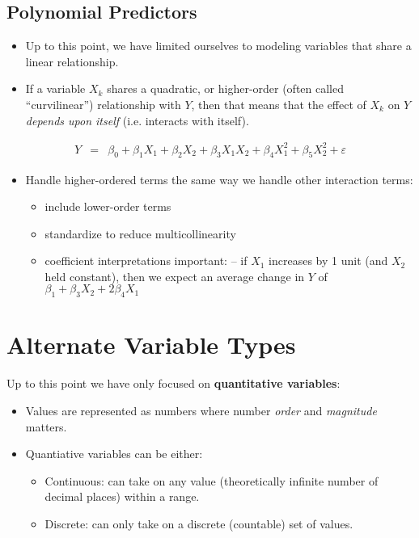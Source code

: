 \documentclass[12pt]{../notes}
\begin{document}
\subsection{Polynomial Predictors}
\begin{itemize}
\item Up to this point, we have limited ourselves to modeling variables that share a linear relationship.
\item If a variable $X_k$ shares a quadratic, or higher-order (often called ``curvilinear'') relationship with $Y$, then that means that the effect of $X_k$ on $Y$ \textit{depends upon itself} (i.e. interacts with itself). 
\end{itemize}
  \begin{eqnarray}
      Y & = & \beta_0 + \beta_1 X_1 + \beta_2 X_2 + \beta_3 X_1 X_2 + \beta_4 X_1^2 + \beta_5 X_2^2 + \varepsilon \nonumber
  \end{eqnarray}
  \begin{itemize}
  \item Handle higher-ordered terms the same way we handle other interaction terms:
       \begin{itemize}
          \item include lower-order terms
          \item standardize to reduce multicollinearity
          \item coefficient interpretations important:
          -- if $X_1$ increases by 1 unit (and $X_2$ held constant), then we expect an average change in $Y$ of $\beta_1 + \beta_3 X_2 + 2\beta_4X_1$
       \end{itemize}
\end{itemize}

\begin{minipage}[l][3cm][c]{\textwidth}
\end{minipage}

\section{Alternate Variable Types}

Up to this point we have only focused on \textbf{quantitative variables}:
\begin{itemize}
\item Values are represented as numbers where number \textit{order} and \textit{magnitude} matters. 
\item Quantiative variables can be either:
\begin{itemize}
\item Continuous: can take on any value (theoretically infinite number of decimal places) within a range. 
\item Discrete: can only take on a discrete (countable) set of values. 
\end{itemize}
\end{itemize}
\end{document}
